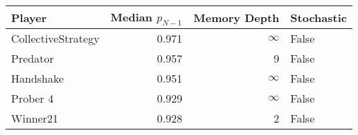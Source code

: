 \begin{tabular}{lrrl}
\toprule
             Player &  Median $p_{N-1}$ &  Memory Depth & Stochastic \\
\midrule
 CollectiveStrategy &             0.971 &            \(\infty\) &      False \\
           Predator &             0.957 &             9 &      False \\
          Handshake &             0.951 &            \(\infty\) &      False \\
           Prober 4 &             0.929 &            \(\infty\) &      False \\
           Winner21 &             0.928 &             2 &      False \\
\bottomrule
\end{tabular}
